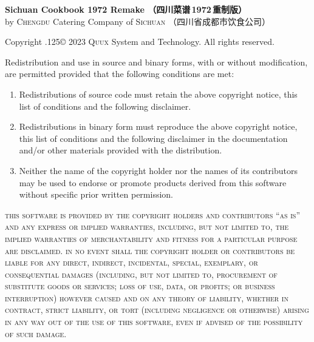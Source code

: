 \enlargethispage{1.328353\baselineskip}%
\begingroup%
\footnotesize%
\singlespacing%
\setlength{\parindent}{0pt}%
\setlength{\parskip}{.1875\baselineskip}%
{\sffamily\bfseries Sichuan Cookbook 1972 Remake\!%
（四川菜谱\,1972\,重制版）}\\
by \textsc{Chengdu} Catering Company of \textsc{Sichuan}\!%
（四川省成都市饮食公司）

\null

Copyright {\lower.125\baselineskip\hbox{\normalsize\copyright}} 2023
\textsc{Quux} System and Technology. All rights reserved.

Redistribution and use in source and binary forms, with or without
modification, are permitted provided that the following conditions are met:

\begin{enumerate}
\item Redistributions of source code must retain the above copyright notice,
      this list of conditions and the following disclaimer.

\item Redistributions in binary form must reproduce the above copyright notice,
      this list of conditions and the following disclaimer in the documentation
      and/or other materials provided with the distribution.

\item Neither the name of the copyright holder nor the names of its
      contributors may be used to endorse or promote products derived from
      this software without specific prior written permission.
\end{enumerate}

\begingroup%
%
\textsc{this software is provided by the copyright holders and contributors
``as is'' and any express or implied warranties, including, but not limited to,
the implied warranties of merchantability and fitness for a particular purpose
are disclaimed. in no event shall the copyright holder or contributors be
liable for any direct, indirect, incidental, special, exemplary, or
consequential damages (including, but not limited to, procurement of
substitute goods or services; loss of use, data, or profits; or business
interruption) however caused and on any theory of liability, whether in
contract, strict liability, or tort (including negligence or otherwise)
arising in any way out of the use of this software, even if advised of the
possibility of such damage.}

\endgroup

